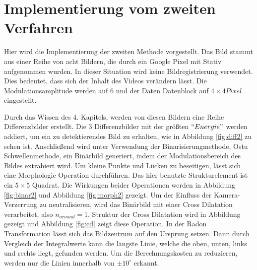 


\section{Implementierung vom zweiten Verfahren}

Hier wird die Implementierung der zweiten Methode vorgestellt. Das Bild stammt aus einer Reihe von acht Bildern, die durch ein Google Pixel mit Stativ aufgenommen wurden. In dieser Situation wird keine Bildregistrierung verwendet. Dies bedeutet, dass sich der Inhalt des Videos verändern lässt. Die Modulationsamplitude werden auf 6 und der Daten Datenblock auf $ 4 \times 4 Pixel$ eingestellt. 

Durch das Wissen des 4. Kapitels, werden von diesen Bildern eine Reihe Differenzbilder erstellt. Die 3 Differenzbilder mit der größten $``Energie"$ werden addiert, um ein zu detektierendes Bild zu erhalten, wie in Abbildung \ref{fig:diff2} zu sehen ist. Anschließend wird unter Verwendung der Binarisierungmethode, Ostu Schwellenmethode, ein Binärbild generiert, indem der Modulationsbereich des Bildes extrahiert wird. Um kleine Punkte und Lücken zu beseitigen, lässt sich eine Morphologie Operation durchführen. Das hier benutzte Strukturelement ist ein $5 \times 5$ Quadrat. Die Wirkungen beider Operationen werden in Abbildung \ref{fig:binar2} und Abbildung \ref{fig:morph2} gezeigt. Um der Einfluss der Kamera-Verzerrung zu neutralisieren, wird das Binärbild mit einer Cross Dilatation verarbeitet, also $ n_{around} = 1$. Struktur der Cross Dilatation wird in Abbildung gezeigt und Abbildung \ref{fig:cd} zeigt diese Operation. 
In der Radon Transformation lässt sich das Bildzentrum auf den Ursprung setzen. Dann durch Vergleich der Integralwerte kann die längste Linie, welche die oben, unten, links und rechts liegt, gefunden werden. Um die Berechnungskosten zu reduzieren, werden nur die Linien innerhalb von $ \pm 10^{\circ} $ erkannt. 




